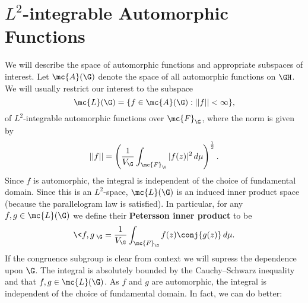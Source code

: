   \section{\texorpdfstring{$L^{2}$}{L{2}}-integrable Automorphic Functions}
    We will describe the space of automorphic functions and appropriate subspaces of interest. Let $\mc{A}(\G)$ denote the space of all automorphic functions on $\GH$. We will usually restrict our interest to the subspace
    \[
      \mc{L}(\G) = \{f \in \mc{A}(\G):||f|| < \infty\},
    \]
    of $L^{2}$-integrable automorphic functions over $\mc{F}_{\G}$, where the norm is given by
    \[
      ||f|| = \left(\frac{1}{V_{\G}}\int_{\mc{F}_{\G}}|f(z)|^{2}\,d\mu\right)^{\frac{1}{2}}.
    \]
    Since $f$ is automorphic, the integral is independent of the choice of fundamental domain. Since this is an $L^{2}$-space, $\mc{L}(\G)$ is an induced inner product space (because the parallelogram law is satisfied). In particular, for any $f,g \in \mc{L}(\G)$ we define their \textbf{Petersson inner product} to be
    \[
      \<f,g\>_{\G} = \frac{1}{V_{\G}}\int_{\mc{F}_{\G}}f(z)\conj{g(z)}\,d\mu.
    \]
    If the congruence subgroup is clear from context we will supress the dependence upon $\G$. The integral is absolutely bounded by the Cauchy–Schwarz inequality and that $f,g \in \mc{L}(\G)$. As $f$ and $g$ are automorphic, the integral is independent of the choice of fundamental domain. In fact, we can do better:

